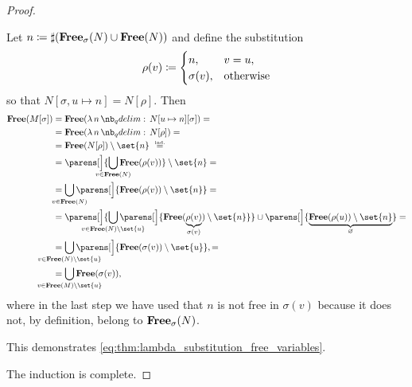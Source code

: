 \begin{proof}
\begin{itemize}
\begin{itemize}
      Let \( n \coloneqq \sharp(\op*{Free}_\sigma(N) \cup \op*{Free}(N)) \) and define the substitution
      \begin{equation*}
        \rho(v) \coloneqq \begin{cases}
          n,         &v = u, \\
          \sigma(v), &\T{otherwise}
        \end{cases}
      \end{equation*}
      so that \( N[\sigma, u \mapsto n] = N[\rho] \). Then
      \begin{align*}
        \op*{Free}(M[\sigma])
        &=
        \op*{Free}(\qabs n N[u \mapsto n][\sigma])
        = \\ &=
        \op*{Free}(\qabs n N[\rho])
        = \\ &=
        \op*{Free}(N[\rho]) \setminus \set{ n }
        \reloset {\T{ind.}} = \\ &=
        \parens[\Big]{ \bigcup_{\mathclap{v \in \op*{Free}(N)}} \op*{Free}(\rho(v)) } \setminus \set{ n }
        = \\ &=
        \bigcup_{\mathclap{v \in \op*{Free}(N)}} \parens[\Big]{ \op*{Free}(\rho(v)) \setminus \set{ n } }
        = \\ &=
        \parens[\Big]{ \bigcup_{\mathclap{v \in \op*{Free}(N) \setminus \set{ u }}} \parens[\Big]{ \op*{Free}(\underbrace{\rho(v)}_{\sigma(v)}) \setminus \set{ n } } } \cup \parens[\Big]{ \underbrace{\op*{Free}(\rho(u)) \setminus \set{ n }}_\varnothing }
        = \\ &=
        \bigcup_{\mathclap{v \in \op*{Free}(N) \setminus \set{ u }}} \parens[\Big]{ \op*{Free}(\sigma(v)) \setminus \set{ u } },
        = \\ &=
        \bigcup_{\mathclap{v \in \op*{Free}(M) \setminus \set{ u }}} \op*{Free}(\sigma(v)),
      \end{align*}
      where in the last step we have used that \( n \) is not free in \( \sigma(v) \) because it does not, by definition, belong to \( \op*{Free}_\sigma(N) \).

      This demonstrates \eqref{eq:thm:lambda_substitution_free_variables}.
    \end{itemize}
  \end{itemize}

  The induction is complete.
\end{proof}

